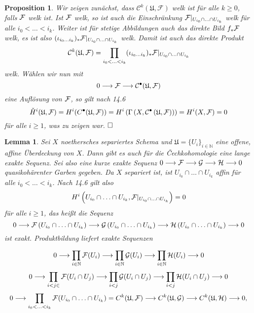 \documentclass[11pt]{book}
\newtheorem{lemma}[theorem]{Lemma}
\newtheorem{proposition}[theorem]{Proposition}
\theoremstyle{nonumberbreak}
\newenvironment{pr}[1][]{\ifthenelse{\equal{#1}{}}{\proof}{\proof[#1]}\rm}{\endproof}
\begin{document}
\begin{spacing}{1.4}
\begin{proposition}
\begin{pr}
Wir zeigen zunächst, dass $\mathcal{C}^{k}(\mathfrak{U}, \mathcal{F})$ welk ist für alle $k \geqslant 0$, falls $\mathcal{F}$ welk ist. Ist $\mathcal{F}$ welk, so ist auch die Einschränkung $\mathcal{F} \vert_{U_{i_0} \cap \ldots \cap U_{i_k}}$ welk für alle $i_0 <\ldots < i_k$. Weiter ist für stetige Abbildungen auch das direkte Bild $f_* \mathcal{F}$ welk, es ist also $(\iota_{i_0 \ldots i_k})_* \mathcal{F} \vert_{U_{i_0} \cap \ldots \cap U_{i_k}}$ welk. Damit ist auch das direkte Produkt 
$$\mathcal{C}^{k}(\mathfrak{U}, \mathcal{F}) = \prod_{i_0 < \ldots < i_k} (\iota_{i_0 \ldots i_k})_* \mathcal{F} \vert_{U_{i_0} \cap \ldots \cap U_{i_k}}$$
welk. Wählen wir nun mit 
$$0 \longrightarrow \mathcal{F} \longrightarrow \mathcal{C}^{\bullet}(\mathfrak{U}, \mathcal{F})$$
eine Auflösung von $\mathcal{F}$, so gilt nach 14.6
$$\check{H}^i(\mathfrak{U}, \mathcal{F}) = H^{i}(C^{\bullet}(\mathfrak{U}, \mathcal{F}))=H^{i}\left( \Gamma\left(X, \mathcal{C}^{\bullet}\left( \mathfrak{U}, \mathcal{F}\right)\right)\right) = H^{i}(X, \mathcal{F}) = 0$$
für alle $i \geqslant 1$, was zu zeigen war. $\hfill \Box$
\end{pr}


\end{proposition}


\begin{lemma}
Sei $X$ noethersches separiertes Schema und $\mathfrak{U}=\{U_i\}_{i \in \mathbb{N}}$ eine offene, affine Überdeckung von $X$. Dann gibt es auch für die \v{C}echkohomologie eine lange exakte Sequenz.
\begin{pr}
Sei also eine kurze exakte Sequenz $0 \longrightarrow \mathcal{F} \longrightarrow \mathcal{G} \longrightarrow \mathcal{H} \longrightarrow 0$ quasikohärenter Garben gegeben. Da $X$ separiert ist, ist $U_{i_0} \cap \ldots \cap U_{i_k}$ affin für alle $i_0 < \ldots < i_k$. Nach 14.6 gilt also 
$$H^{i}\left(U_{i_0} \cap \ldots \cap U_{i_k}, \mathcal{F} \vert_{U_{i_0} \cap \ldots \cap U_{i_k}} \right) = 0$$
für alle $i \geqslant 1$, das heißt die Sequenz 
$$0 \longrightarrow \mathcal{F} \left( U_{i_0} \cap \ldots \cap U_{i_k}\right) \longrightarrow \mathcal{G}\left( U_{i_0} \cap \ldots \cap U_{i_k}\right) \longrightarrow \mathcal{H}\left( U_{i_0} \cap \ldots \cap U_{i_k}\right) \longrightarrow 0$$
ist exakt. Produktbildung liefert exakte Sequenzen


$$ 0 \longrightarrow  \prod_{i \in \mathbb{N}} \mathcal{F}(U_i) \longrightarrow \prod_{i \in \mathbb{N}} \mathcal{G}(U_i) \longrightarrow \prod_{i \in \mathbb{N}} \mathcal{H}(U_i) \longrightarrow 0$$
$$ 0 \longrightarrow  \prod_{i<j \in} \mathcal{F}(U_i \cap U_j) \longrightarrow \prod_{i <j} \mathcal{G}(U_i \cap U_j) \longrightarrow \prod_{i <j} \mathcal{H}(U_i \cap U_j) \longrightarrow 0$$
$$0 \longrightarrow \prod_{i_0 < \ldots < i_k} \mathcal{F}(U_{i_0} \cap \ldots \cap U_{i_k}) = C^{k}(\mathfrak{U}, \mathcal{F}) \longrightarrow C^{k}(\mathfrak{U}, \mathcal{G}) \longrightarrow C^{k}(\mathfrak{U}, \mathcal{H}) \longrightarrow 0,$$


\end{pr}
\end{lemma}
\end{spacing}
\end{document}
